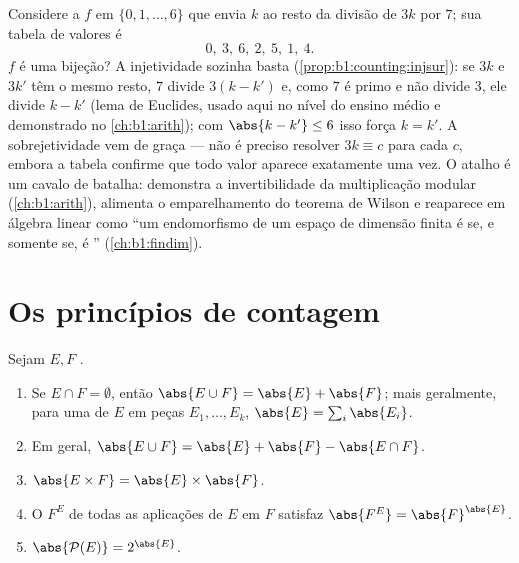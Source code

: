 \begin{example}\label{ex:b1:counting:mod7}
Considere a  $f$ em $\{0, 1, \dots, 6\}$ que envia $k$ ao
resto da divisão de $3k$ por $7$; sua tabela de valores é
\[
0,\ 3,\ 6,\ 2,\ 5,\ 1,\ 4 .
\]
$f$ é uma bijeção? A injetividade sozinha basta
(\cref{prop:b1:counting:injsur}): se $3k$ e $3k'$ têm o mesmo
resto, $7$ divide $3(k - k')$ e, como $7$ é primo e
não divide $3$, ele divide $k - k'$ (lema de Euclides, usado aqui no
nível do ensino médio e demonstrado no \cref{ch:b1:arith}); com
$\abs{k - k'} \leq 6$ isso força $k = k'$. A sobrejetividade vem
de graça --- não é preciso resolver $3k \equiv c$ para cada $c$, embora a
tabela confirme que todo valor aparece exatamente uma vez. O atalho é
um cavalo de batalha: demonstra a invertibilidade da multiplicação
modular (\cref{ch:b1:arith}), alimenta o emparelhamento do
teorema de Wilson e reaparece em álgebra linear como ``um
endomorfismo de um espaço de dimensão finita é  se, e somente
se, é '' (\cref{ch:b1:findim}).
\end{example}

\section{Os princípios de contagem}

\begin{proposition}\label{prop:b1:counting:rules}
Sejam $E, F$ .
\begin{enumerate}
  \item Se $E \cap F = \emptyset$, então $\abs{E \cup F} = \abs{E} +
        \abs{F}$; mais geralmente, para uma  de $E$ em peças
        $E_1, \dots, E_k$, $\abs{E} = \sum_i \abs{E_i}$.
  \item Em geral, $\abs{E \cup F} = \abs{E} + \abs{F} - \abs{E \cap
        F}$.
  \item $\abs{E \times F} = \abs{E} \times \abs{F}$.
  \item O  $F^E$ de todas as aplicações de $E$ em $F$ satisfaz
        $\abs{F^E} = \abs{F}^{\abs{E}}$.
  \item $\abs{\mathcal{P}(E)} = 2^{\abs{E}}$.
\end{enumerate}
\end{proposition}

